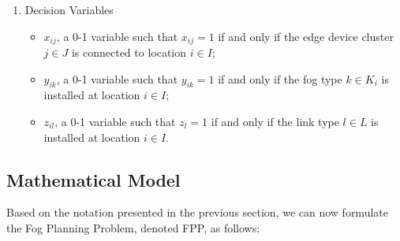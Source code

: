 \documentclass[10pt,journal,compsoc]{IEEEtran}
\begin{document}
\begin{enumerate}
\begin{itemize}
\end{itemize}
\item Decision Variables
\begin{itemize}
\item $x_{ij}$,  a 0-1 variable such that $x_{ij} = 1$ if and only if the edge device cluster $j \in J$ is connected to location $i\in I $;
\item $y_{ik}$, a 0-1 variable such that $y_{ik} = 1$ if and only if the fog type $k \in K_i$ is installed at location $i \in I$;
\item $z_{il}$, a 0-1 variable such that $z_{l}=1$ if and only if the link type $l \in L$ is installed at location $i \in I $. 
\end{itemize}
\end{enumerate}
\subsection{Mathematical Model}\label{obj}
Based on the notation presented in the previous section, we can now formulate the Fog Planning Problem, denoted FPP, as follows:
\end{document}
